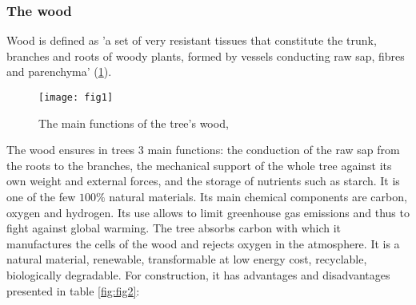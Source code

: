\subsubsection{The wood}

Wood is defined as 'a set of very resistant tissues that constitute the trunk, branches and roots of woody plants, formed by vessels conducting raw sap, fibres and parenchyma' (\ref{fig:fig1}). 


\begin{figure}[htp]
	\centering
	\texttt{[image: fig1]}
	\caption{The main functions of the tree's wood, \cite{B.Thibaut}}
	\label{fig:fig1}
\end{figure}

The wood ensures in trees 3 main functions: the conduction of the raw sap from the roots to the branches, the mechanical support of the whole tree against its own weight and external forces, and the storage of nutrients such as starch. It is one of the few $100 \%$ natural materials. Its main chemical components are carbon, oxygen and hydrogen. Its use allows to limit greenhouse gas emissions and thus to fight against global warming. The tree absorbs carbon with which it manufactures the cells of the wood and rejects oxygen in the atmosphere. It is a natural material, renewable, transformable at low energy cost, recyclable, biologically degradable. For construction, it has advantages and disadvantages presented in table \ref{fig:fig2}:

\begin{comment}
\begin{table} \centering
	\begin{tabular}{cc}
		\toprule %
		 The advantages and disadvantages of wood  \\\midrule
		The advantages & The disavantages \\\midrule
		Solidity and lightness: the strength-to-weight ratio is high. Its low density (500kg/m3) allows the use of less massive foundations.& Natural material and therefore has a high variability \\\midrule  
		Good thermal insulation: it is much less conductive than steel or concrete and reduces thermal bridges in buildings. & Orthotropic material \\\midrule
		Renewable and aesthetic. & Moisture-sensitive material \\\midrule
		Chemically inert. & Material sensitive to attack by insects and fungi \\\midrule
		Good fire behaviour: there is no toxic release, little heat transmission to neighbouring parts. Wood has a higher load-bearing capacity than steel. & Material that requires regular maintenance. \\ 
		\bottomrule %
	\end{tabular}
	\caption{Orders of magnitude of axial compressive strengths and elastic moduli}
	\label{fig:fig13}
\end{table}
\end{comment}

